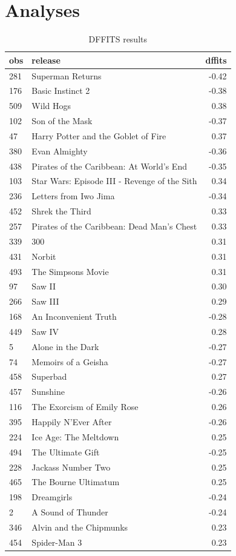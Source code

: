 \documentclass[10pt]{article}
\begin{document}
\section{Analyses}

\begin{table}[H]
\caption{DFFITS results}
\begin{tabular}{llr}
\toprule
obs & release & dffits \\
\midrule
281 & Superman Returns & -0.42 \\
176 & Basic Instinct 2 & -0.38 \\
509 & Wild Hogs & 0.38 \\
102 & Son of the Mask & -0.37 \\
47 & Harry Potter and the Goblet of Fire & 0.37 \\
380 & Evan Almighty & -0.36 \\
438 & Pirates of the Caribbean: At World's End & -0.35 \\
103 & Star Wars: Episode III - Revenge of the Sith & 0.34 \\
236 & Letters from Iwo Jima & -0.34 \\
452 & Shrek the Third & 0.33 \\
257 & Pirates of the Caribbean: Dead Man's Chest & 0.33 \\
339 & 300 & 0.31 \\
431 & Norbit & 0.31 \\
493 & The Simpsons Movie & 0.31 \\
97 & Saw II & 0.30 \\
266 & Saw III & 0.29 \\
168 & An Inconvenient Truth & -0.28 \\
449 & Saw IV & 0.28 \\
5 & Alone in the Dark & -0.27 \\
74 & Memoirs of a Geisha & -0.27 \\
458 & Superbad & 0.27 \\
457 & Sunshine & -0.26 \\
116 & The Exorcism of Emily Rose & 0.26 \\
395 & Happily N'Ever After & -0.26 \\
224 & Ice Age: The Meltdown & 0.25 \\
494 & The Ultimate Gift & -0.25 \\
228 & Jackass Number Two & 0.25 \\
465 & The Bourne Ultimatum & 0.25 \\
198 & Dreamgirls & -0.24 \\
2 & A Sound of Thunder & -0.24 \\
346 & Alvin and the Chipmunks & 0.23 \\
454 & Spider-Man 3 & 0.23 \\
\bottomrule
\end{tabular}
\end{table}
\end{document}
